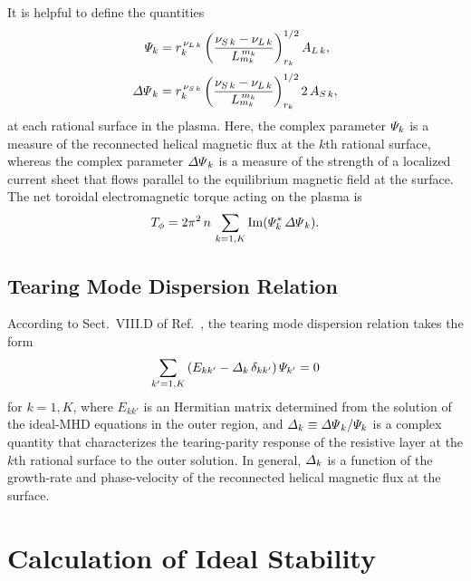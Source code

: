 \documentclass[12pt,prb,aps]{revtex4-1}
\begin{document}
It is helpful to define the quantities\,\cite{tj}
\begin{align}\label{Psidef}
{\mit\Psi}_k&= r_k^{\,\nu_{L\,k}}\left(\frac{\nu_{S\,k}-\nu_{L\,k}}{L_{m_k}^{\,{m_k}}}\right)^{1/2}_{r_k} A_{L\,k},\\[0.5ex]
{\mit\Delta\Psi}_k &= r_k^{\,\nu_{S\,k}}\left(\frac{\nu_{S\,k}-\nu_{L\,k}}{L_{m_k}^{\,m_k}}\right)^{1/2}_{r_k} 2\,A_{S\,k},\label{edpp}
\end{align}
at each rational surface in the plasma. Here, the complex parameter ${\mit\Psi}_k$ is a measure of the reconnected helical magnetic flux at the $k$th rational surface, whereas
the complex parameter ${\mit\Delta\Psi}_k$ is a measure of the strength of a localized current sheet that flows parallel to the equilibrium magnetic field at the surface. 
The net toroidal electromagnetic torque acting on the plasma is\,\cite{tj}
\begin{equation}\label{torque}
T_\phi = 2\pi^2\,n\,\sum_{k=1,K}{\rm Im}({\mit\Psi}_k^\ast\,{\mit\Delta\Psi}_k).
\end{equation}

\subsection{Tearing Mode Dispersion Relation}\label{disp}
According to Sect.~VIII.D of Ref.~, the tearing mode dispersion relation takes the form
\begin{equation}\label{dispersion}
\sum_{k'=1,K}\left(E_{kk'}-{\mit\Delta}_k\,\delta_{kk'}\right){\mit\Psi}_{k'} = 0
\end{equation}
for $k=1,K$, 
where $E_{kk'}$ is an Hermitian matrix determined from the solution of the ideal-MHD equations in the outer region, and ${\mit\Delta}_k\equiv {\mit\Delta\Psi}_k/{\mit\Psi}_k$ is
a complex quantity that characterizes the tearing-parity response of the resistive layer at the $k$th rational surface to the outer solution. 
In general, ${\mit\Delta}_k$ is a function of the growth-rate and phase-velocity of the reconnected helical magnetic flux at the surface. 

\section{Calculation of Ideal Stability}\label{ideal}
\end{document}
